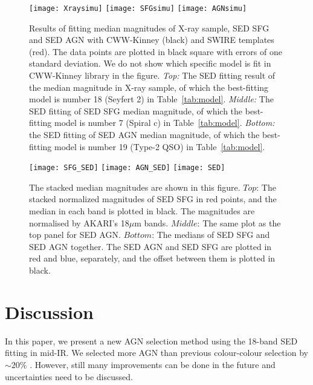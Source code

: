 \documentclass[a4paper,fleqn,usenatbib]{mnras}
\begin{document}
\begin{figure}
	\texttt{[image: Xraysimu]}
	\texttt{[image: SFGsimu]}
	\texttt{[image: AGNsimu]}  
    \caption{Results of fitting median magnitudes of X-ray sample, SED SFG and SED AGN with CWW-Kinney (black) and SWIRE templates (red). The data points are plotted in black square with errors of one standard deviation. We do not show which specific model is fit in CWW-Kinney library in the figure.  \textsl{Top:} The SED fitting result of the median magnitude in X-ray sample, of which the best-fitting model is number 18 (Seyfert 2) in Table~\ref{tab:model}. \textsl{Middle:} The SED fitting of SED SFG median magnitude, of which the best-fitting model is number 7 (Spiral c) in Table~\ref{tab:model}. \textsl{Bottom:} the SED fitting of SED AGN median magnitude, of which the best-fitting model is number 19 (Type-2 QSO) in Table~\ref{tab:model}. }
   \label{fig:simu}
\end{figure}

\begin{figure}
     	\texttt{[image: SFG\_SED]}                 
        \texttt{[image: AGN\_SED]}          
        \texttt{[image: SED]} 
    \caption{The stacked median magnitudes are shown in this figure. $Top$: The stacked normalized magnitudes of SED SFG in red points, and the median in each band is plotted in black. The magnitudes are normalised by AKARI's 18$\mu$m bands. $Middle$: The same plot as the top panel for SED AGN. $Bottom$: The medians of SED SFG and SED AGN together. The SED AGN and SED SFG are plotted in red and blue, separately, and the offset between them is plotted in black.}
   \label{fig:SEDs}   
\end{figure}






\section{Discussion}
\label{discussion}

In this paper, we present a new AGN selection method using the 18-band SED fitting in mid-IR. We selected more AGN than previous colour-colour selection by $\sim20\%$ . However, still many improvements can be done in the future and uncertainties need to be discussed. 
  
\end{document}
